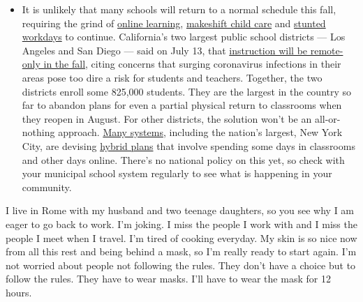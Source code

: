 \begin{itemize}
  \begin{itemize}
  \tightlist
  \item
    It is unlikely that many schools will return to a normal schedule
    this fall, requiring the grind of
    \href{https://www.nytimes3xbfgragh.onion/2020/06/05/us/coronavirus-education-lost-learning.html?action=click\&pgtype=Article\&state=default\&region=MAIN_CONTENT_3\&context=storylines_faq}{online
    learning},
    \href{https://www.nytimes3xbfgragh.onion/2020/05/29/us/coronavirus-child-care-centers.html?action=click\&pgtype=Article\&state=default\&region=MAIN_CONTENT_3\&context=storylines_faq}{makeshift
    child care} and
    \href{https://www.nytimes3xbfgragh.onion/2020/06/03/business/economy/coronavirus-working-women.html?action=click\&pgtype=Article\&state=default\&region=MAIN_CONTENT_3\&context=storylines_faq}{stunted
    workdays} to continue. California's two largest public school
    districts --- Los Angeles and San Diego --- said on July 13, that
    \href{https://www.nytimes3xbfgragh.onion/2020/07/13/us/lausd-san-diego-school-reopening.html?action=click\&pgtype=Article\&state=default\&region=MAIN_CONTENT_3\&context=storylines_faq}{instruction
    will be remote-only in the fall}, citing concerns that surging
    coronavirus infections in their areas pose too dire a risk for
    students and teachers. Together, the two districts enroll some
    825,000 students. They are the largest in the country so far to
    abandon plans for even a partial physical return to classrooms when
    they reopen in August. For other districts, the solution won't be an
    all-or-nothing approach.
    \href{https://bioethics.jhu.edu/research-and-outreach/projects/eschool-initiative/school-policy-tracker/}{Many
    systems}, including the nation's largest, New York City, are
    devising
    \href{https://www.nytimes3xbfgragh.onion/2020/06/26/us/coronavirus-schools-reopen-fall.html?action=click\&pgtype=Article\&state=default\&region=MAIN_CONTENT_3\&context=storylines_faq}{hybrid
    plans} that involve spending some days in classrooms and other days
    online. There's no national policy on this yet, so check with your
    municipal school system regularly to see what is happening in your
    community.
  \end{itemize}
\end{itemize}

I live in Rome with my husband and two teenage daughters, so you see why
I am eager to go back to work. I'm joking. I miss the people I work with
and I miss the people I meet when I travel. I'm tired of cooking
everyday. My skin is so nice now from all this rest and being behind a
mask, so I'm really ready to start again. I'm not worried about people
not following the rules. They don't have a choice but to follow the
rules. They have to wear masks. I'll have to wear the mask for 12 hours.


